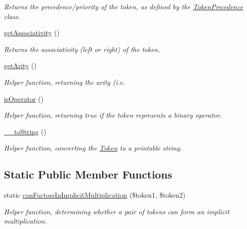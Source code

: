 \begin{DoxyCompactItemize}
\begin{DoxyCompactList}\small\item\em Returns the precedence/priority of the token, as defined by the \hyperlink{classMathParser_1_1Lexing_1_1TokenPrecedence}{Token\-Precedence} class. \end{DoxyCompactList}\item 
\hyperlink{classMathParser_1_1Lexing_1_1Token_ad3f1b618049f80f771f5e655841d06e7}{get\-Associativity} ()
\begin{DoxyCompactList}\small\item\em Returns the associativity (left or right) of the token. \end{DoxyCompactList}\item 
\hyperlink{classMathParser_1_1Lexing_1_1Token_ab34d92857d22182fc8aa82bcd7e1de3a}{get\-Arity} ()
\begin{DoxyCompactList}\small\item\em Helper function, returning the arity (i.\-e. \end{DoxyCompactList}\item 
\hyperlink{classMathParser_1_1Lexing_1_1Token_aa75fbfc8c2131200c664a6f9ab724915}{is\-Operator} ()
\begin{DoxyCompactList}\small\item\em Helper function, returning true if the token represents a binary operator. \end{DoxyCompactList}\item 
\hyperlink{classMathParser_1_1Lexing_1_1Token_a25b9b060edcb1da92ec0a1358aac99c9}{\-\_\-\-\_\-to\-String} ()
\begin{DoxyCompactList}\small\item\em Helper function, converting the \hyperlink{classMathParser_1_1Lexing_1_1Token}{Token} to a printable string. \end{DoxyCompactList}\end{DoxyCompactItemize}
\subsection*{Static Public Member Functions}
\begin{DoxyCompactItemize}
\item 
static \hyperlink{classMathParser_1_1Lexing_1_1Token_aeb8c3be1afc671d5046624be0fd83377}{can\-Factors\-In\-Implicit\-Multiplication} (\$token1, \$token2)
\begin{DoxyCompactList}\small\item\em Helper function, determining whether a pair of tokens can form an implicit multiplication. \end{DoxyCompactList}\end{DoxyCompactItemize}

